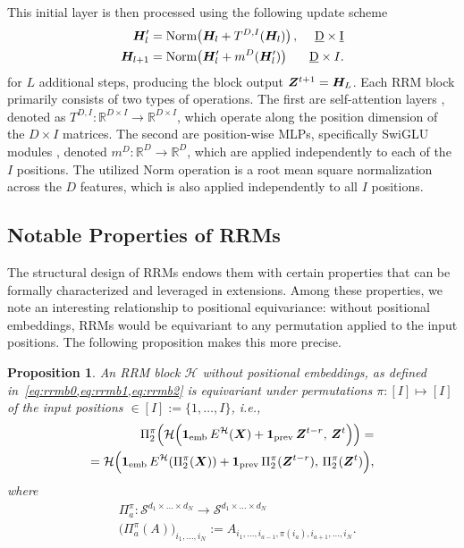 \documentclass{article}
\theoremstyle{plain}
\newtheorem{proposition}[theorem]{Proposition}
\theoremstyle{definition}
\theoremstyle{remark}
\begin{document}
This initial layer is then processed using the following update scheme
\begin{align} 
    \bm{H}'_{l} &= \text{Norm}\!\left(
        \bm{H}_{l} + T^{D,I}(\bm{H}_{l})
    \right), & \underbar{D} \times \underbar{I} \label{eq:rrmb1} \\
    \bm{H}_{l+1} &= \text{Norm}\!\left(
        \bm{H}'_{l} + m^{D}(\bm{H}'_{l})
    \right) & \underbar{D} \times I  \label{eq:rrmb2}.
\end{align}
for $L$ additional steps, producing the block output $\bm{Z}^{t+1} = \bm{H}_L$. Each RRM block primarily consists of two types of operations. The first are self-attention layers \citep{vaswani2017attention}, denoted as $T^{D,I}: \mathbb{R}^{D \times I} \to \mathbb{R}^{D \times I}$, which operate along the position dimension of the $D \times I$ matrices. The second are position-wise MLPs, specifically SwiGLU modules \citep{shazeer2020glu}, denoted $m^D: \mathbb{R}^D \to \mathbb{R}^D$, which are applied independently to each of the $I$ positions. The utilized $\text{Norm}$ operation is a root mean square normalization \citep{zhang2019root} across the $D$ features, which is also applied independently to all $I$ positions.

\subsection{Notable Properties of RRMs}

The structural design of RRMs endows them with certain properties that can be formally characterized and leveraged in extensions. Among these properties, we note an interesting relationship to positional equivariance: without positional embeddings, RRMs would be equivariant to any permutation applied to the input positions. The following proposition makes this more precise.

\begin{proposition} \label{RRMposeq}
    An RRM block $\mathcal H$ without positional embeddings, as defined in~\cref{eq:rrmb0,eq:rrmb1,eq:rrmb2} is equivariant under permutations $\pi: [I] \mapsto [I]$ of the input positions $\in [I]:=\{1,\ldots,I\}$, i.e.,
\begin{align*}
\Pi_2^\pi\Big(\mathcal H\Big(\mathbf{1}_{\text{emb}}\, E^{\mathcal H}(\bm{X}) + \mathbf{1}_{\text{prev}}\, \bm{Z}^{t-r}, \, \bm{Z}^t\Big)\Big) = \nonumber \\
=\mathcal H\Big(\mathbf{1}_{\text{emb}}\, E^{\mathcal H}(\Pi_2^\pi(\bm{X})) + \mathbf{1}_{\text{prev}}\, \Pi_2^\pi(\bm{Z}^{t-r}), \, \Pi_2^\pi(\bm{Z}^t)\Big),
\end{align*}
where 
\begin{align*}
&\Pi_a^\pi : \mathcal{S}^{d_1 \times \dots \times d_N} \to \mathcal{S}^{d_1 \times \dots \times d_N}\\
&\big(\Pi_a^\pi(A)\big)_{i_1, \dots, i_N} := 
A_{i_1, \dots, i_{a-1}, \pi(i_a), i_{a+1}, \dots, i_N}.
\end{align*}

\end{proposition}
\end{document}
